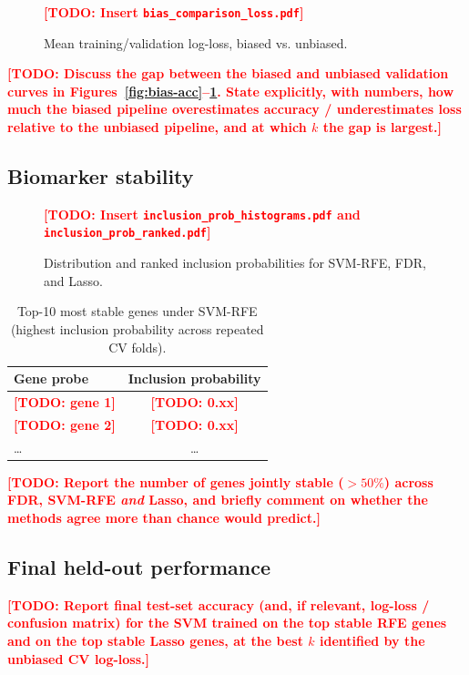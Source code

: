 \documentclass[11pt,a4paper]{article}
\newcommand{\todo}[1]{\textcolor{red}{\textbf{[TODO: #1]}}}
\begin{document}
\begin{figure}[h!]
    \centering
    \todo{Insert \texttt{bias\_comparison\_loss.pdf}}
    \caption{Mean training/validation log-loss, biased vs. unbiased.}
    \label{fig:bias-loss}
\end{figure}

\todo{Discuss the gap between the biased and unbiased validation curves
in Figures~\ref{fig:bias-acc}--\ref{fig:bias-loss}. State explicitly, with
numbers, how much the biased pipeline overestimates accuracy / underestimates
loss relative to the unbiased pipeline, and at which $k$ the gap is largest.}

\subsection{Biomarker stability}
\begin{figure}[h!]
    \centering
    \todo{Insert \texttt{inclusion\_prob\_histograms.pdf} and
    \texttt{inclusion\_prob\_ranked.pdf}}
    \caption{Distribution and ranked inclusion probabilities for SVM-RFE,
    FDR, and Lasso.}
    \label{fig:stability}
\end{figure}

\begin{table}[h!]
    \centering
    \caption{Top-10 most stable genes under SVM-RFE (highest inclusion
    probability across repeated CV folds).}
    \label{tab:top-genes}
    \begin{tabular}{lc}
        \toprule
        Gene probe & Inclusion probability \\
        \midrule
        \todo{gene 1} & \todo{0.xx} \\
        \todo{gene 2} & \todo{0.xx} \\
        \dots & \dots \\
        \bottomrule
    \end{tabular}
\end{table}

\todo{Report the number of genes jointly stable ($>50\%$) across FDR,
SVM-RFE \emph{and} Lasso, and briefly comment on whether the methods agree
more than chance would predict.}

\subsection{Final held-out performance}
\todo{Report final test-set accuracy (and, if relevant, log-loss / confusion
matrix) for the SVM trained on the top stable RFE genes and on the top
stable Lasso genes, at the best $k$ identified by the unbiased CV log-loss.}
\end{document}
